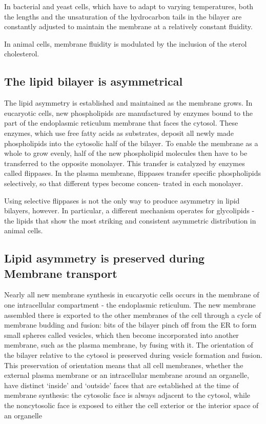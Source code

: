 In bacterial and yeast cells, which have to adapt to varying temperatures,
both the lengths and the unsaturation of the hydrocarbon tails in the
bilayer are constantly adjusted to maintain the membrane at a relatively
constant fluidity.

In animal cells, membrane fluidity is modulated by the inclusion of the
sterol cholesterol.

\subsection{The lipid bilayer is asymmetrical}

The lipid asymmetry is established and maintained as the membrane
grows. In eucaryotic cells, new phospholipids are manufactured by
enzymes bound to the part of the endoplasmic reticulum membrane that
faces the cytosol. These enzymes, which use free fatty acids as substrates, 
deposit all newly made phospholipids into the
cytosolic half of the bilayer. To enable the membrane as a whole to grow
evenly, half of the new phospholipid molecules then have to be transferred 
to the opposite monolayer. This transfer is catalyzed by enzymes
called flippases. In the plasma membrane, flippases transfer
specific phospholipids selectively, so that different types become concen-
trated in each monolayer.

Using selective flippases is not the only way to produce asymmetry in
lipid bilayers, however. In particular, a different mechanism operates for
glycolipids - the lipids that show the most striking and consistent asymmetric 
distribution in animal cells.

\subsection{Lipid asymmetry is preserved during Membrane transport}

Nearly all new membrane synthesis in eucaryotic cells occurs in the
membrane of one intracellular compartment - the endoplasmic reticulum.
The new membrane assembled there is exported
to the other membranes of the cell through a cycle of membrane budding
and fusion: bits of the bilayer pinch off from the ER to form small spheres
called vesicles, which then become incorporated into another membrane,
such as the plasma membrane, by fusing with it. The orientation 
of the bilayer relative to the cytosol is preserved during vesicle
formation and fusion. This preservation of orientation means that all cell
membranes, whether the external plasma membrane or an intracellular
membrane around an organelle, have distinct ‘inside’ and ‘outside’ faces
that are established at the time of membrane synthesis: the cytosolic face
is always adjacent to the cytosol, while the noncytosolic face is exposed
to either the cell exterior or the interior space of an organelle

